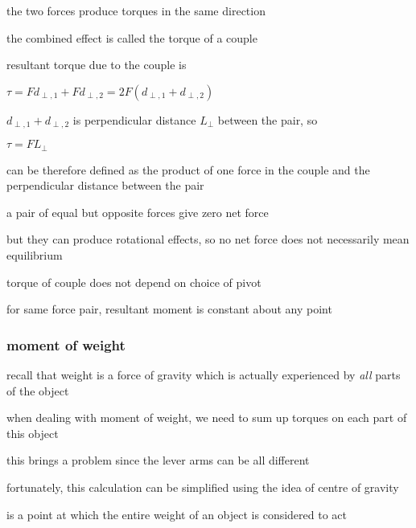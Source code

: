 the two forces produce torques in the same direction

the combined effect is called the torque of a couple



resultant torque due to the couple is

{
	\centering
	
	$ \tau = Fd_{\perp,1} + Fd_{\perp,2} = 2F(d_{\perp,1} + d_{\perp,2}) $
	
}

$d_{\perp,1} + d_{\perp,2}$ is perpendicular distance $L_\perp$ between the pair, so

{
	\centering
	
	$ \boxed{\tau = F L_\perp} $
	
}

\begin{ilight}
	 can be therefore defined as the product of one force in the couple and the perpendicular distance between the pair
\end{ilight}

\cmt a pair of equal but opposite forces give zero net force

but they can produce rotational effects, so no net force does not necessarily mean equilibrium

\cmt torque of couple does not depend on choice of pivot

for same force pair, resultant moment is constant about any point



\subsubsection{moment of weight}

recall that weight is a force of gravity which is actually experienced by \emph{all} parts of the object

when dealing with moment of weight, we need to sum up torques on each part of this object

this brings a problem since the lever arms can be all different

fortunately, this calculation can be simplified using the idea of centre of gravity

\begin{ilight}
	 is a point at which the entire weight of an object is considered to act
\end{ilight}




